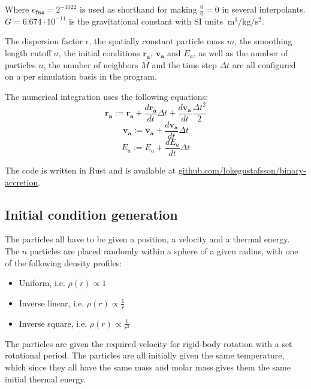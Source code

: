 \documentclass[../main.tex]{subfiles}
\begin{document}
Where $\mathtt{\epsilon_{f64}} = 2^{-1022}$ is used as shorthand for making $\frac{0}{0} = 0$ in
several interpolants. $G = 6.674 \cdot 10^{-11}$ is the gravitational constant with SI units
$\SI{}{\meter\cubed\per\kilo\gram\per\second\squared}$.

The dispersion factor $\epsilon$, the spatially constant particle mass $m$, the smoothing length
cutoff $\sigma$, the initial conditions $\bm{r_a}$, $\bm{v_a}$ and $E_a$, as well as the number of
particles $n$, the number of neighbors $M$ and the time step $\Delta t$ are all configured on a per simulation basis in the
program.

The numerical integration uses the following equations:
\begin{equation}
  \bm{r_a} := \bm{r_a}
    + \frac{d\bm{r_a}}{dt} \Delta t
    + \frac{d\bm{v_a}}{dt} \frac{\Delta t^2}{2}
\end{equation}
\begin{equation}
    \bm{v_a} := \bm{v_a} + \frac{d\bm{v_a}}{dt} \Delta t
\end{equation}
\begin{equation}
    E_a := E_a + \frac{dE_a}{dt} \Delta t
\end{equation}


The code is written in Rust and is available at
\href{https://github.com/lokegustafsson/binary-accretion}{github.com/lokegustafsson/binary-accretion}.

\subsection{Initial condition generation}
The particles all have to be given a position, a velocity and a thermal energy. The $n$ particles
are placed randomly within a sphere of a given radius, with one of the following density profiles:

\begin{itemize}
    \item Uniform, i.e. $\rho(r) \propto 1$
    \item Inverse linear, i.e. $\rho(r) \propto \frac{1}{r}$
    \item Inverse square, i.e. $\rho(r) \propto \frac{1}{r^2}$
\end{itemize}

The particles are given the required velocity for rigid-body rotation with a set rotational
period. The particles are all initially given the same temperature, which since they all have the
same mass and molar mass gives them the same initial thermal energy.
\end{document}
